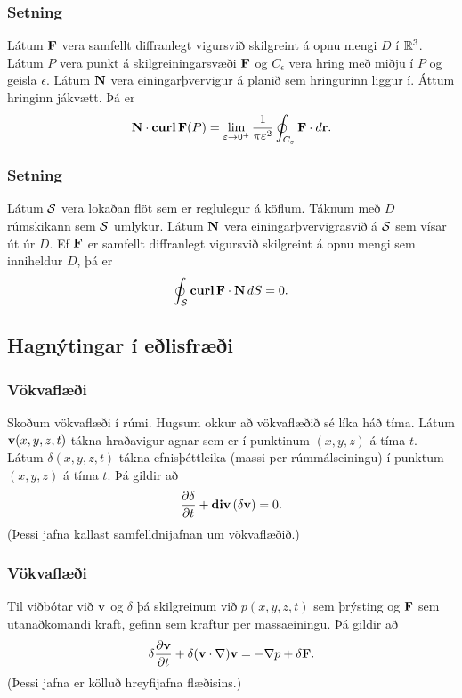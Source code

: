 \subsubsection{Setning \rtask{}}
 Látum $\mbox{${\bf F}$}$ vera samfellt
diffranlegt vigursvið skilgreint á opnu mengi $D$ í ${\mathbb R}^3$.    Látum
$P$ vera punkt á skilgreiningarsvæði $\mbox{${\bf F}$}$ og $C_\epsilon$ vera
hring með miðju í $P$ og geisla $\epsilon$.  Látum $\mbox{${\bf N}$}$ vera
einingarþvervigur á planið sem hringurinn liggur í.  Áttum hringinn
jákvætt.
Þá er
$$\mbox{${\bf N}$}\cdot\mbox{${\rm\bf curl\,}$} \mbox{${\bf F}$}(P)=\lim_{\varepsilon\rightarrow 0^+}
\frac{1}{\pi\varepsilon^2}\oint_{C_\varepsilon}\mbox{${\bf F}$}\cdot d\mbox{${\bf r}$}.$$
   


\subsubsection{Setning \rtask{}}
Látum $\cal S$ vera lokaðan flöt sem er
reglulegur á köflum.  Táknum með $D$ rúmskikann sem $\cal S$ umlykur.
Látum $\mbox{${\bf N}$}$ vera einingarþvervigrasvið á $\cal S$   sem vísar út úr
$D$.  Ef $\mbox{${\bf F}$}$ er samfellt diffranlegt vigursvið skilgreint á opnu
mengi sem inniheldur $D$, 
þá er 
$$\oint_{\cal S}\mbox{${\rm\bf curl\,}$}\mbox{${\bf F}$}\cdot\mbox{${\bf N}$}\,dS=0.$$



\subsection{Hagnýtingar í eðlisfræði} 

\subsubsection{Vökvaflæði \rtask{}}
Skoðum vökvaflæði í rúmi.  Hugsum okkur að vökvaflæðið sé líka háð tíma.  Látum $\mbox{${\bf v}$}(x,y,z,t)$ tákna hraðavigur agnar sem er í punktinum  $(x,y,z)$ á tíma $t$.  Látum $\delta(x,y,z,t)$ tákna efnisþéttleika (massi per rúmmálseiningu) í punktum $(x,y,z)$ á tíma $t$.  Þá gildir að 
$$\frac{\partial \delta}{\partial t}+\mbox{${\rm\bf div\,}$}(\delta\mbox{${\bf v}$})=0.$$
(Þessi jafna kallast samfelldnijafnan um vökvaflæðið.)


\subsubsection{Vökvaflæði \rtask{}}
 Til viðbótar við $\mbox{${\bf v}$}$ og $\delta$ þá skilgreinum við $p(x,y,z,t)$ sem þrýsting og $\mbox{${\bf F}$}$ sem utanaðkomandi kraft, gefinn sem kraftur per massaeiningu.  Þá gildir að $$\delta\frac{\partial \mbox{${\bf v}$}}{\partial t}+\delta(\mbox{${\bf v}$}\cdot\nabla)\mbox{${\bf v}$}=-\nabla p+\delta\mbox{${\bf F}$}.$$
(Þessi jafna er kölluð hreyfijafna flæðisins.)


